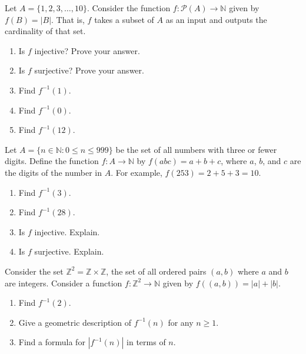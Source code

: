 \documentclass[10pt,]{book}
\theoremstyle{plain}
\theoremstyle{definition}
\theoremstyle{definition}
\theoremstyle{definition}
\theoremstyle{definition}
\numberwithin{equation}{chapter}
\def\N{\mathbb N}
\def\Z{\mathbb Z}
\def\pow{\mathcal P}
\def\inv{^{-1}}
\def\st{:}
\begin{document}
\begin{divisionexercise}{6}\hypertarget{exercise-208}{}
\hypertarget{p-1702}{}%
Let \(A = \{1,2,3,\ldots,10\}\). Consider the function \(f:\pow(A) \to \N\) given by \(f(B) = |B|\). That is, \(f\) takes a subset of \(A\) as an input and outputs the cardinality of that set. \leavevmode%
\begin{enumerate}[label=(\alph*)]
\item\hypertarget{li-581}{}\hypertarget{p-1703}{}%
Is \(f\) injective? Prove your answer.%
\item\hypertarget{li-582}{}\hypertarget{p-1704}{}%
Is \(f\) surjective? Prove your answer.%
\item\hypertarget{li-583}{}\hypertarget{p-1705}{}%
Find \(f\inv(1)\).%
\item\hypertarget{li-584}{}\hypertarget{p-1706}{}%
Find \(f\inv(0)\).%
\item\hypertarget{li-585}{}\hypertarget{p-1707}{}%
Find \(f\inv(12)\).%
\end{enumerate}
%
\end{divisionexercise}%
\begin{divisionexercise}{7}\hypertarget{exercise-209}{}
\hypertarget{p-1714}{}%
Let \(A = \{n \in \N \st 0 \le n \le 999\}\) be the set of all numbers with three or fewer digits. Define the function \(f:A \to \N\) by \(f(abc) = a+b+c\), where \(a\), \(b\), and \(c\) are the digits of the number in \(A\). For example, \(f(253) = 2 + 5 + 3 =  10\). \leavevmode%
\begin{enumerate}[label=(\alph*)]
\item\hypertarget{li-591}{}\hypertarget{p-1715}{}%
Find \(f\inv(3)\).%
\item\hypertarget{li-592}{}\hypertarget{p-1716}{}%
Find \(f\inv(28)\).%
\item\hypertarget{li-593}{}\hypertarget{p-1717}{}%
Is \(f\) injective. Explain.%
\item\hypertarget{li-594}{}\hypertarget{p-1718}{}%
Is \(f\) surjective. Explain.%
\end{enumerate}
%
\end{divisionexercise}%
\begin{divisionexercise}{8}\hypertarget{exercise-210}{}
\hypertarget{p-1722}{}%
Consider the set \(\Z^2 = \Z \times \Z\), the set of all ordered pairs \((a,b)\) where \(a\) and \(b\) are integers.  Consider a function \(f: \Z^2 \to \N\) given by \(f((a,b)) = |a| + |b|\). \leavevmode%
\begin{enumerate}[label=(\alph*)]
\item\hypertarget{li-599}{}\hypertarget{p-1723}{}%
Find \(f\inv(2)\).%
\item\hypertarget{li-600}{}\hypertarget{p-1724}{}%
Give a geometric description of \(f\inv(n)\) for any \(n \ge 1\).%
\item\hypertarget{li-601}{}\hypertarget{p-1725}{}%
Find a formula for \(|f\inv(n)|\) in terms of \(n\).%
\end{enumerate}
%
\end{divisionexercise}%
\end{document}
